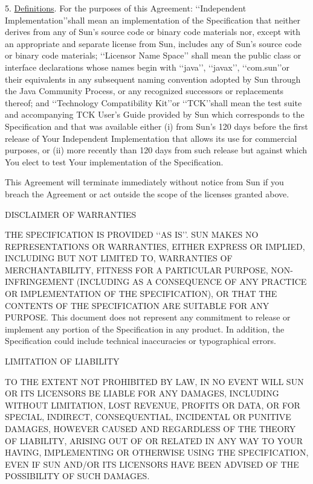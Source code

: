5. \underline{Definitions}. For the purposes of this Agreement: \lq\lq Independent
Implementation\rq\rq shall mean an implementation of the Specification that
neither derives from any of Sun's source code or binary code materials
nor, except with an appropriate and separate license from Sun, includes
any of Sun's source code or binary code materials; \lq\lq Licensor Name Space\rq\rq
shall mean the public class or interface declarations whose names begin
with \lq\lq java\rq\rq, \lq\lq javax\rq\rq, \lq\lq com.sun\rq\rq or their equivalents in any subsequent
naming convention adopted by Sun through the Java Community Process, or
any recognized successors or replacements thereof; and \lq\lq Technology
Compatibility Kit\rq\rq or \lq\lq TCK\rq\rq shall mean the test suite and accompanying
TCK User's Guide provided by Sun which corresponds to the Specification
and that was available either (i) from Sun's 120 days before the first
release of Your Independent Implementation that allows its use for
commercial purposes, or (ii) more recently than 120 days from such
release but against which You elect to test Your implementation of the
Specification.


This Agreement will terminate immediately without notice from Sun if you
breach the Agreement or act outside the scope of the licenses granted above.


DISCLAIMER OF WARRANTIES


THE SPECIFICATION IS PROVIDED \lq\lq AS IS\rq\rq. SUN MAKES NO REPRESENTATIONS OR
WARRANTIES, EITHER EXPRESS OR IMPLIED, INCLUDING BUT NOT LIMITED TO,
WARRANTIES OF MERCHANTABILITY, FITNESS FOR A PARTICULAR PURPOSE,
NON-INFRINGEMENT (INCLUDING AS A CONSEQUENCE OF ANY PRACTICE OR
IMPLEMENTATION OF THE SPECIFICATION), OR THAT THE CONTENTS OF THE
SPECIFICATION ARE SUITABLE FOR ANY PURPOSE. This document does not
represent any commitment to release or implement any portion of the
Specification in any product. In addition, the Specification could
include technical inaccuracies or typographical errors.


LIMITATION OF LIABILITY


TO THE EXTENT NOT PROHIBITED BY LAW, IN NO EVENT WILL SUN OR ITS
LICENSORS BE LIABLE FOR ANY DAMAGES, INCLUDING WITHOUT LIMITATION, LOST
REVENUE, PROFITS OR DATA, OR FOR SPECIAL, INDIRECT, CONSEQUENTIAL,
INCIDENTAL OR PUNITIVE DAMAGES, HOWEVER CAUSED AND REGARDLESS OF THE
THEORY OF LIABILITY, ARISING OUT OF OR RELATED IN ANY WAY TO YOUR
HAVING, IMPLEMENTING OR OTHERWISE USING THE SPECIFICATION, EVEN
IF SUN AND/OR ITS LICENSORS HAVE BEEN ADVISED OF THE POSSIBILITY OF SUCH
DAMAGES.

